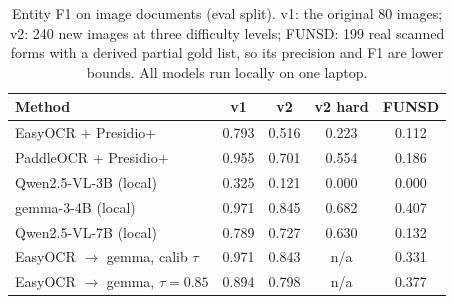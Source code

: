 \begin{table}[t]
\centering
\scriptsize
\caption{Entity F1 on image documents (eval split). v1: the original 80 images; v2: 240 new images at three difficulty levels; FUNSD: 199 real scanned forms with a derived partial gold list, so its precision and F1 are lower bounds. All models run locally on one laptop.}
\label{tab:pii}
\begin{tabular}{lcccc}
\hline
Method & v1 & v2 & v2 hard & FUNSD \\
\hline
EasyOCR + Presidio+ & 0.793 & 0.516 & 0.223 & 0.112 \\
PaddleOCR + Presidio+ & 0.955 & 0.701 & 0.554 & 0.186 \\
Qwen2.5-VL-3B (local) & 0.325 & 0.121 & 0.000 & 0.000 \\
gemma-3-4B (local) & 0.971 & 0.845 & 0.682 & 0.407 \\
Qwen2.5-VL-7B (local) & 0.789 & 0.727 & 0.630 & 0.132 \\
EasyOCR $\rightarrow$ gemma, calib $\tau$ & 0.971 & 0.843 & n/a & 0.331 \\
EasyOCR $\rightarrow$ gemma, $\tau=0.85$ & 0.894 & 0.798 & n/a & 0.377 \\
\hline
\end{tabular}
\end{table}
